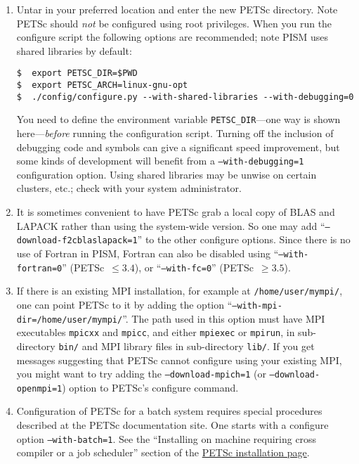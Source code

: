 \documentclass[titlepage,letterpaper,final]{scrartcl}
\begin{document}
\renewcommand{\labelenumi}{(\roman{enumi})}
\begin{enumerate}
\item Untar in your preferred location and enter the new PETSc directory.
  Note PETSc should \emph{not} be configured using root privileges.
  When you run the configure script the following
  options are recommended; note PISM uses shared libraries by
  default:
\begin{verbatim}
$  export PETSC_DIR=$PWD
$  export PETSC_ARCH=linux-gnu-opt
$  ./config/configure.py --with-shared-libraries --with-debugging=0
\end{verbatim}

You need to define the environment variable \texttt{PETSC_DIR}---one
way is shown here---\emph{before} running the configuration script.  Turning off the
inclusion of debugging code and symbols can give a significant speed improvement,
but some kinds of development will benefit from a \texttt{--with-debugging=1}
configuration option.  Using shared libraries may be unwise on certain clusters,
etc.; check with your system administrator.

\item It is sometimes convenient to have PETSc grab a local copy of
BLAS and
LAPACK rather than using the
system-wide version. So one may add ``\texttt{--download-f2cblaslapack=1}'' to
the other configure options. Since there is no use of Fortran in PISM, Fortran
can also be disabled using ``\texttt{--with-fortran=0}'' (PETSc~$\le 3.4$),
or ``\texttt{--with-fc=0}'' (PETSc~$\ge 3.5$).

\item If there is an existing MPI installation, for example at \texttt{/home/user/mympi/}, one can point PETSc to it by adding the option ``\texttt{--with-mpi-dir=/home/user/mympi/}''.  The path used in this option must have MPI executables \texttt{mpicxx} and \texttt{mpicc}, and either \texttt{mpiexec} or \texttt{mpirun}, in sub-directory \texttt{bin/} and MPI library files in sub-directory \texttt{lib/}. If you get messages suggesting that PETSc cannot configure using your existing MPI, you might want to try adding the \texttt{--download-mpich=1} (or \texttt{--download-openmpi=1}) option to PETSc's configure command.

\item Configuration of PETSc for a batch system requires special procedures described at the PETSc documentation site.  One starts with a configure option \texttt{--with-batch=1}.  See the ``Installing on machine requiring cross compiler or a job scheduler'' section of the \href{http://www.mcs.anl.gov/petsc/petsc-2/documentation/installation.html}{PETSc installation page}.


\end{enumerate}
\end{document}
